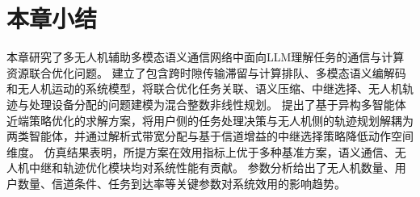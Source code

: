 \section{本章小结}

本章研究了多无人机辅助多模态语义通信网络中面向LLM理解任务的通信与计算资源联合优化问题。
建立了包含跨时隙传输滞留与计算排队、多模态语义编解码和无人机运动的系统模型，将联合优化任务关联、语义压缩、中继选择、无人机轨迹与处理设备分配的问题建模为混合整数非线性规划。
提出了基于异构多智能体近端策略优化的求解方案，将用户侧的任务处理决策与无人机侧的轨迹规划解耦为两类智能体，并通过解析式带宽分配与基于信道增益的中继选择策略降低动作空间维度。
仿真结果表明，所提方案在效用指标上优于多种基准方案，语义通信、无人机中继和轨迹优化模块均对系统性能有贡献。
参数分析给出了无人机数量、用户数量、信道条件、任务到达率等关键参数对系统效用的影响趋势。
